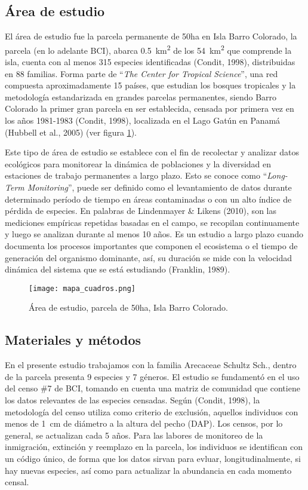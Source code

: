 \documentclass[11pt,]{article}
\begin{document}
\subsection{Área de estudio}\label{uxe1rea-de-estudio}

El área de estudio fue la parcela permanente de 50ha en Isla Barro
Colorado, la parcela (en lo adelante BCI), abarca
0.5~km\textsuperscript{2} de los 54~km\textsuperscript{2} que comprende
la isla, cuenta con al menos 315 especies identificadas (Condit, 1998),
distribuidas en 88 familias. Forma parte de ``\emph{The Center for
Tropical Science}'', una red compuesta aproximadamente 15 países, que
estudian los bosques tropicales y la metodología estandarizada en
grandes parcelas permanentes, siendo Barro Colorado la primer gran
parcela en ser establecida, censada por primera vez en los años
1981-1983 (Condit, 1998), localizada en el Lago Gatún en Panamá (Hubbell
et al., 2005) (ver figura \ref{fig:mapa_cuadros}).

Este tipo de área de estudio se establece con el fin de recolectar y
analizar datos ecológicos para monitorear la dinámica de poblaciones y
la diversidad en estaciones de trabajo permanentes a largo plazo. Esto
se conoce como ``\emph{Long-Term Monitoring}'', puede ser definido como
el levantamiento de datos durante determinado período de tiempo en áreas
contaminadas o con un alto índice de pérdida de especies. En palabras de
Lindenmayer \& Likens (2010), son las mediciones empíricas repetidas
basadas en el campo, se recopilan continuamente y luego se analizan
durante al menos 10 años. Es un estudio a largo plazo cuando documenta
los procesos importantes que componen el ecosistema o el tiempo de
generación del organismo dominante, así, su duración se mide con la
velocidad dinámica del sistema que se está estudiando (Franklin, 1989).

\begin{figure}
\centering
\texttt{[image: mapa\_cuadros.png]}
\caption{Área de estudio, parcela de 50ha, Isla Barro Colorado.
\label{fig:mapa_cuadros}}
\end{figure}

\subsection{Materiales y métodos}\label{materiales-y-muxe9todos}

En el presente estudio trabajamos con la familia Arecaceae Schultz Sch.,
dentro de la parcela presenta 9 especies y 7 géneros. El estudio se
fundamentó en el uso del censo \#7 de BCI, tomando en cuenta una matriz
de comunidad que contiene los datos relevantes de las especies censadas.
Según (Condit, 1998), la metodología del censo utiliza como criterio de
exclusión, aquellos individuos con menos de 1~cm de diámetro a la altura
del pecho (DAP). Los censos, por lo general, se actualizan cada 5 años.
Para las labores de monitoreo de la inmigración, extinción y reemplazo
en la parcela, los individuos se identifican con un código único, de
forma que los datos sirvan para evluar, longitudinalmente, si hay nuevas
especies, así como para actualizar la abundancia en cada momento censal.
\end{document}
